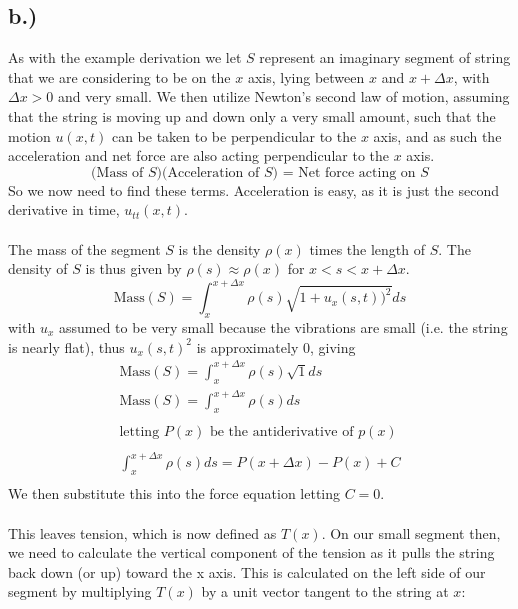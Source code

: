 \documentclass{article}
\begin{document}
\subsection*{b.)}
As with the example derivation we let $S$ represent an imaginary segment of string that we are considering to be on the $x$ axis, lying between $x$ and $x + \Delta x$, with $\Delta x >0$ and very small. We then utilize Newton's second law of motion, assuming that the string is moving up and down only a very small amount, such that the motion $u(x, t)$ can be taken to be perpendicular to the $x$ axis, and as such the acceleration and net force are also acting perpendicular to the $x$ axis.
\begin{equation}
\text{(Mass of $S$)(Acceleration of $S$) = Net force acting on $S$}
\end{equation}
So we now need to find these terms. Acceleration is easy, as it is just the second derivative in time, $u_{tt}(x, t)$. \\
\\
The mass of the segment $S$ is the density $\rho(x)$ times the length of $S$. The density of $S$ is thus given by $\rho (s) \approx \rho (x)$ for $x < s < x + \Delta x$.
\begin{equation}
\text{Mass} (S) = \int_{x}^{x + \Delta x} \rho (s) \sqrt{1 + u_x(s,t))^2}ds
\end{equation}
with $u_x$ assumed to be very small because the vibrations are small (i.e. the string is nearly flat), thus $u_x(s,t)^2$ is approximately $0$, giving
\begin{equation}
\begin{aligned}
\text{Mass} (S) = \int_{x}^{x + \Delta x} \rho (s) \sqrt{1}ds\\
\text{Mass} (S) = \int_{x}^{x + \Delta x} \rho (s)ds\\
\\
\text{letting } P(x) \text{ be the antiderivative of } p(x)\\
\\
\int_{x}^{x + \Delta x} \rho (s)ds = P(x + \Delta x) - P(x) + C\\
\end{aligned}
\end{equation}
We then substitute this into the force equation letting $C = 0$. \\
\\
This leaves tension, which is now defined as $T(x)$. On our small segment then, we need to calculate the vertical component of the tension as it pulls the string back down (or up) toward the x axis. This is calculated on the left side of our segment by multiplying $T(x)$ by a unit vector tangent to the string at $x$:
\end{document}
